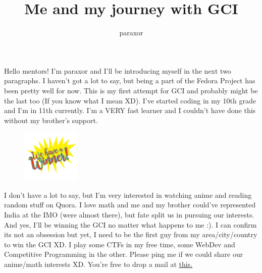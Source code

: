 \documentclass{article}
\title{Me and my journey with GCI}
\author{paraxor}
\begin{document}
\maketitle
\thispagestyle{fancy}
\lettrine{H}{}ello mentors! I'm paraxor and I'll be introducing myself in the next two paragraphs. I haven't got a lot to say, but being a part of the Fedora Project has been pretty well for now. This is my first attempt for GCI and probably might be the last too (If you know what I mean XD). I've started coding in my 10th grade and I'm in 11th currently. I'm a VERY fast learner and I couldn't have done this without my brother's support. 

\medbreak
\begin{figure}
  \begin{center}
    \includegraphics[width=0.25\textwidth]{winner.jpg}
  \end{center}
\end{figure}
I don't have a lot to say, but I'm very interested in watching anime and reading random stuff on Quora. I love math and me and my brother could've represented India at the IMO (were almost there), but fate split us in pursuing our interests. And yes, I'll be winning the GCI no matter what happens to me :). I can confirm its not an obsession but yet, I need to be the first guy from my area/city/country to win the GCI XD. I play some CTFs in my free time, some WebDev and Competitive Programming in the other. Please ping me if we could share our anime/math interests XD. You're free to drop a mail at \href{mailto:pwn4p4r4xor@gmail.com}{this.}
\end{document}
